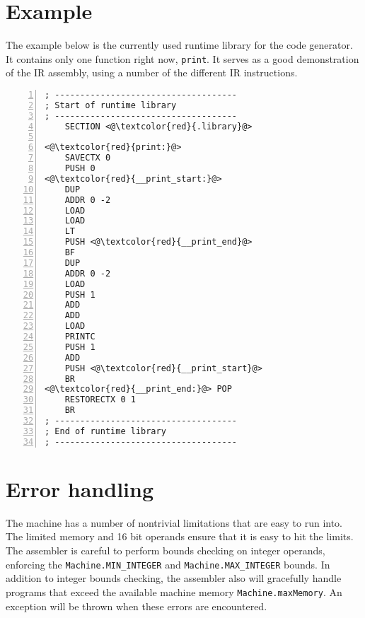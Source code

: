 \documentclass[oneside]{amsart}
\theoremstyle{definition}
\theoremstyle{remark}
\numberwithin{equation}{section}
\begin{document}
\section{Example}
The example below is the currently used runtime library for the code generator. It contains only
one function right now, \texttt{print}. It serves as a good demonstration of the IR assembly, using
a number of the different IR instructions.
\begin{lstlisting}[numbers=left]
; ------------------------------------
; Start of runtime library
; ------------------------------------
    SECTION <@\textcolor{red}{.library}@>

<@\textcolor{red}{print:}@>
    SAVECTX 0
    PUSH 0
<@\textcolor{red}{__print_start:}@>
    DUP
    ADDR 0 -2
    LOAD
    LOAD
    LT
    PUSH <@\textcolor{red}{__print_end}@>
    BF
    DUP
    ADDR 0 -2
    LOAD
    PUSH 1
    ADD
    ADD
    LOAD
    PRINTC
    PUSH 1
    ADD
    PUSH <@\textcolor{red}{__print_start}@>
    BR
<@\textcolor{red}{__print_end:}@> POP
    RESTORECTX 0 1
    BR
; ------------------------------------
; End of runtime library
; ------------------------------------
\end{lstlisting}

\section{Error handling}
The machine has a number of nontrivial limitations that are easy to run into. The limited memory
and 16 bit operands ensure that it is easy to hit the limits. The assembler is careful to perform
bounds checking on integer operands, enforcing the \texttt{Machine.MIN_INTEGER} and
\texttt{Machine.MAX_INTEGER} bounds. In addition to integer bounds checking, the assembler also will
gracefully handle programs that exceed the available machine memory \texttt{Machine.maxMemory}. An
exception will be thrown when these errors are encountered.

\end{document}
